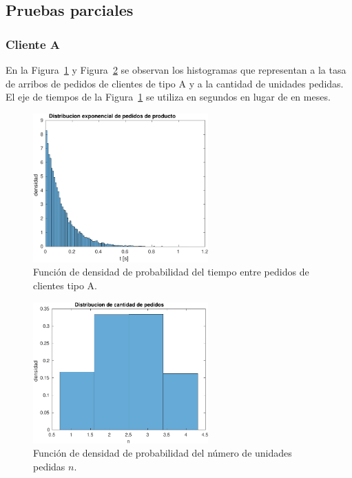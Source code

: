 \documentclass[10pt]{article}
\begin{document}
\subsection{Pruebas parciales}


 
\subsubsection{Cliente A} 
 
En la Figura~\ref{fig:pdftiempo} y Figura~\ref{fig:pdfpedidos} se observan los histogramas que representan a la tasa de arribos de pedidos de clientes de tipo A y a la cantidad de unidades pedidas. El eje de tiempos de la Figura~\ref{fig:pdftiempo} se utiliza en segundos en lugar de en meses. 
 
\begin{figure} 
\centering 
\includegraphics[width=0.6\textwidth]{img/pdf_tiempo_pedidos} 
\caption{Función de densidad de probabilidad del tiempo entre pedidos de clientes tipo A.} 
\label{fig:pdftiempo} 
\end{figure} 
 
\begin{figure} 
\centering 
\includegraphics[width=0.6\textwidth]{img/pdf_cantidad_pedidos} 
\caption{Función de densidad de probabilidad del número de unidades pedidas $n$.} 
\label{fig:pdfpedidos} 
\end{figure}
\FloatBarrier
\end{document}
